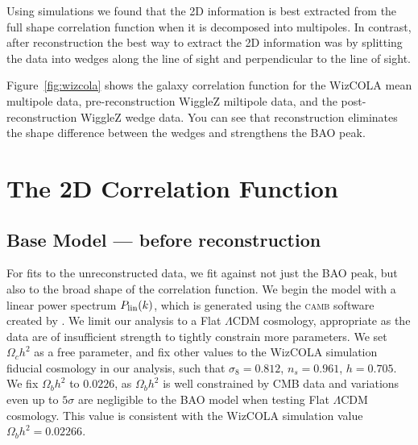 \documentclass[iop,twocolappendix]{emulateapj}
\newcommand{\camb}{\textsc{camb}}
\begin{document}
Using simulations we found that the 2D information is best extracted from the full shape correlation function when it is decomposed into multipoles.  In contrast, after reconstruction the best way to extract the 2D information was by splitting the data into wedges along the line of sight and perpendicular to the line of sight.

Figure~\ref{fig:wizcola} shows the galaxy correlation function for the WizCOLA mean multipole data, pre-reconstruction WiggleZ miltipole data, and the post-reconstruction WiggleZ wedge data. You can see that reconstruction eliminates the shape difference between the wedges and strengthens the BAO peak. 






\section{The 2D Correlation Function}
\label{sec:model}

\subsection{Base Model --- before reconstruction}
For fits to the unreconstructed data, we fit against not just the BAO peak, but also to the broad shape of the correlation function. We begin the model with a linear power spectrum $P_{\rm{lin}}(k)$, which is  generated using the \camb{} software created by \citet{Lewis2000}. We limit our analysis to a Flat $\Lambda$CDM cosmology, appropriate as the data are of insufficient strength to tightly constrain more parameters.
We set $\Omega_c h^2$ as a free parameter, and fix other values to the WizCOLA simulation fiducial cosmology in our analysis, such that $\sigma_8 = 0.812$, $n_s=0.961$, $h = 0.705$. We fix $\Omega_b h^2$ to $0.0226$, as $\Omega_b h^2$ is well constrained by CMB data and variations even up to $5\sigma$ are negligible to the BAO model when testing Flat $\Lambda$CDM cosmology. This value is consistent with the WizCOLA simulation value $\Omega_b h^2 = 0.02266$. 
\end{document}
